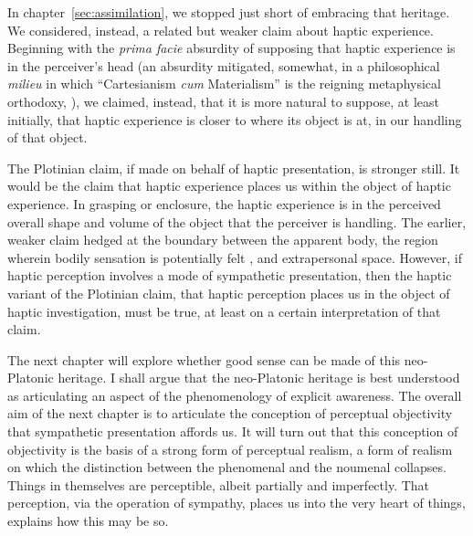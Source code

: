 In chapter~\ref{sec:assimilation}, we stopped just short of embracing that heritage. We considered, instead, a related but weaker claim about haptic experience. Beginning with the \emph{prima facie} absurdity of supposing that haptic experience is in the perceiver's head (an absurdity mitigated, somewhat, in a philosophical \emph{milieu} in which ``Cartesianism \emph{cum} Materialism'' is the reigning metaphysical orthodoxy, \citealt{Putnam:1993kx,Putnam:1994kx,Putnam:1999eu}), we claimed, instead, that it is more natural to suppose, at least initially, that haptic experience is closer to where its object is at, in our handling of that object. 

The Plotinian claim, if made on behalf of haptic presentation, is stronger still. It would be the claim that haptic experience places us within the object of haptic experience. In grasping or enclosure, the haptic experience is in the perceived overall shape and volume of the object that the perceiver is handling. The earlier, weaker claim hedged at the boundary between the apparent body, the region wherein bodily sensation is potentially felt \citep{Martin:1992aa}, and extrapersonal space. However, if haptic perception involves a mode of sympathetic presentation, then the haptic variant of the Plotinian claim, that haptic perception places us in the object of haptic investigation, must be true, at least on a certain interpretation of that claim. 

The next chapter will explore whether good sense can be made of this neo-Platonic heritage. I shall argue that the neo-Platonic heritage is best understood as articulating an aspect of the phenomenology of explicit awareness. The overall aim of the next chapter is to articulate the conception of perceptual objectivity that sympathetic presentation affords us. It will turn out that this conception of objectivity is the basis of a strong form of perceptual realism, a form of realism on which the distinction between the phenomenal and the noumenal collapses. Things in themselves are perceptible, albeit partially and imperfectly. That perception, via the operation of sympathy, places us into the very heart of things, explains how this may be so.





